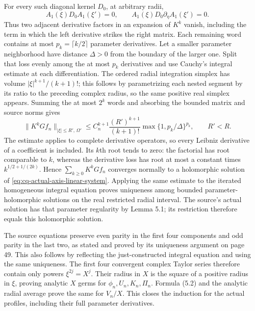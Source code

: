 For every such diagonal kernel $D_0$, at arbitrary radii,
\[
 A_1(\xi)D_0A_1(\xi')=0,\qquad
 A_1(\xi)D_0\partial_\eta A_1(\xi')=0.
\]
Thus two adjacent derivative factors in an expansion of $K^k$
vanish, including the term in which the left derivative strikes
the right matrix. Each remaining word contains at most
$p_k=\lceil k/2\rceil$ parameter derivatives. Let a smaller
parameter neighborhood have distance $\Delta>0$ from the
boundary of the larger one. Split that loss evenly among the
at most $p_k$ derivatives and use Cauchy's integral estimate at
each differentiation. The ordered radial integration simplex
has volume $|\xi|^{k+1}/(k+1)!$; this follows by parametrizing
each nested segment by its ratio to the preceding complex
radius, so the same positive real simplex appears. Summing
the at most $2^k$ words and absorbing the bounded matrix and
source norms gives
\begin{equation}
 \|K^kGf_n\|_{|\xi|\leq R',\,\Omega'}
 \leq C_n^{k+1}\frac{(R')^{k+1}}{(k+1)!}
           \max\{1,p_k/\Delta\}^{p_k},\qquad R'<R .
 \label{eq:cq-actual-complex-axis-Picard-bound}
\end{equation}
The estimate applies to complete derivative operators, so every
Leibniz derivative of a coefficient is included.
Its $k$th root tends to zero: the factorial has root comparable
to $k$, whereas the derivative loss has root at most a constant
times $k^{1/2+1/(2k)}$. Hence
$\sum_{k\geq0}K^kGf_n$ converges normally to a holomorphic
solution of \eqref{eq:cq-actual-axis-linear-system}. Applying
the same estimate to the iterated homogeneous integral equation
proves uniqueness among bounded parameter-holomorphic solutions
on the real restricted radial interval. The source's actual
solution has that parameter regularity by Lemma 5.1; its
restriction therefore equals this holomorphic solution.

The source equations preserve even parity in the first four
components and odd parity in the last two, as stated and proved
by its uniqueness argument on page 49. This also follows by
reflecting the just-constructed integral equation and using the
same uniqueness. The first four convergent complex Taylor
series therefore contain only powers $\xi^{2j}=X^j$.
Their radius in $X$ is the square of a positive radius in
$\xi$, proving analytic $X$ germs for $\phi_n,U_n,K_n,\Pi_n$.
Formula (5.2) and the analytic radial average prove the same
for $V_n/X$. This closes the induction for the actual profiles,
including their full parameter derivatives.


